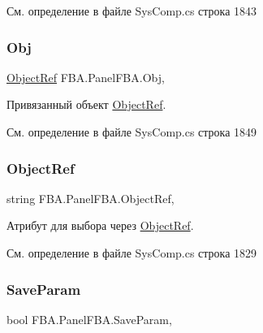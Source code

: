 См. определение в файле Sys\+Comp.\+cs строка 1843

\mbox{\label{class_f_b_a_1_1_panel_f_b_a_a7ad5a02284e18f39585c13da75f624f8}} 
\subsubsection{\texorpdfstring{Obj}{Obj}}
{\footnotesize\ttfamily \mbox{\hyperlink{class_f_b_a_1_1_object_ref}{Object\+Ref}} F\+B\+A.\+Panel\+F\+B\+A.\+Obj\hspace{0.3cm}{\ttfamily [get]}, {\ttfamily [set]}}



Привязанный объект \mbox{\hyperlink{class_f_b_a_1_1_object_ref}{Object\+Ref}}. 



См. определение в файле Sys\+Comp.\+cs строка 1849

\mbox{\label{class_f_b_a_1_1_panel_f_b_a_aa2095cd6b2a47d1564cdb92987f9c4e7}} 
\subsubsection{\texorpdfstring{Object\+Ref}{ObjectRef}}
{\footnotesize\ttfamily string F\+B\+A.\+Panel\+F\+B\+A.\+Object\+Ref\hspace{0.3cm}{\ttfamily [get]}, {\ttfamily [set]}}



Атрибут для выбора через \mbox{\hyperlink{class_f_b_a_1_1_object_ref}{Object\+Ref}}. ~\newline




См. определение в файле Sys\+Comp.\+cs строка 1829

\mbox{\label{class_f_b_a_1_1_panel_f_b_a_a010c5cb9807f94ae4bfb73ab49c9cb11}} 
\subsubsection{\texorpdfstring{Save\+Param}{SaveParam}}
{\footnotesize\ttfamily bool F\+B\+A.\+Panel\+F\+B\+A.\+Save\+Param\hspace{0.3cm}{\ttfamily [get]}, {\ttfamily [set]}}



